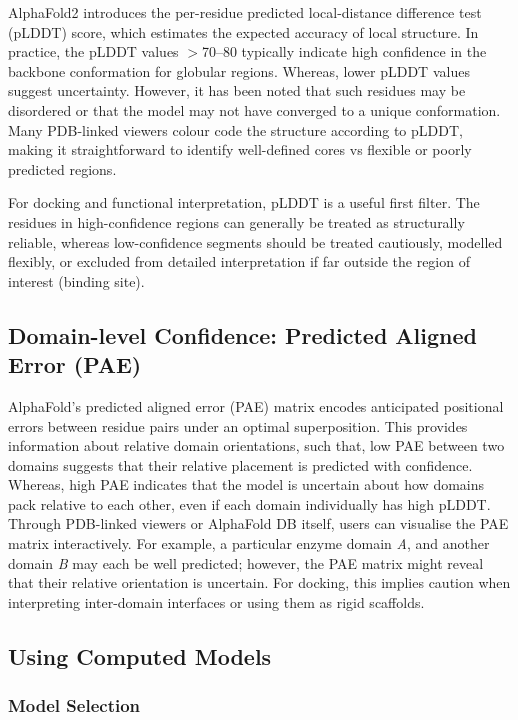 \documentclass[12pt]{article}
\begin{document}
AlphaFold2\cite{CH4_Jumper2021_AlphaFold,CH4_Varadi2022_AlphaFoldDB} introduces the per-residue predicted local-distance difference test (pLDDT) score, which estimates the expected accuracy of local structure. In practice, the pLDDT values $>$70--80 typically indicate high confidence in the backbone conformation for globular regions. Whereas, lower pLDDT values suggest uncertainty. However, it has been noted that such residues may be disordered or that the model may not have converged to a unique conformation. Many PDB-linked viewers colour code the structure according to pLDDT, making it straightforward to identify well-defined cores vs flexible or poorly predicted regions.

For docking and functional interpretation, pLDDT is a useful first filter. The residues in high-confidence regions can generally be treated as structurally reliable, whereas low-confidence segments should be treated cautiously, modelled flexibly, or excluded from detailed interpretation if far outside the region of interest (binding site).

\subsection{Domain-level Confidence: Predicted Aligned Error (PAE)}

AlphaFold's\cite{CH4_Jumper2021_AlphaFold} predicted aligned error (PAE) matrix encodes anticipated positional errors between residue pairs under an optimal superposition. This provides information about relative domain orientations, such that, low PAE between two domains suggests that their relative placement is predicted with confidence. Whereas, high PAE indicates that the model is uncertain about how domains pack relative to each other, even if each domain individually has high pLDDT. Through PDB-linked viewers or AlphaFold DB itself, users can visualise the PAE matrix interactively. For example, a particular enzyme domain \emph{A}, and another domain \emph{B} may each be well predicted; however, the PAE matrix might reveal that their relative orientation is uncertain. For docking, this implies caution when interpreting inter-domain interfaces or using them as rigid scaffolds.

\subsection{Using Computed Models}

\subsubsection{Model Selection}
\end{document}
